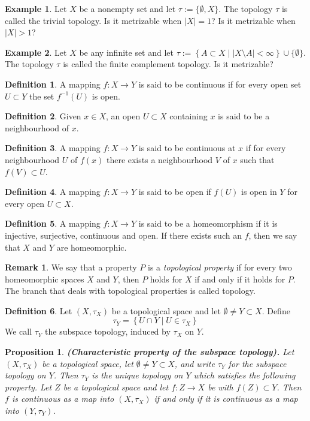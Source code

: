 \documentclass[11pt,a4paper]{article}
\theoremstyle{definition}
\newtheorem{definition}{Definition}[section]
\newtheorem{remark}{Remark}[section]
\newtheorem{example}{Example}[section]
\theoremstyle{plain}
\newtheorem{proposition}[theorem]{Proposition}
\newcommand{\set}[2]{ \left\{ #1 \mid #2 \right\} }
\newcommand{\abs}[1]{\left\lvert #1\right\rvert}
\renewcommand{\tt}[1]{\textnormal{\textbf{(#1).}}} %
\begin{document}
	\begin{example}
		Let $X$ be a nonempty set and let $\tau := \{\emptyset,X\}$. The topology 
		$\tau$ is called the trivial topology. Is it metrizable when $|X| = 1$?
		Is it metrizable when $|X| > 1$?
	\end{example}
	\begin{example}
		Let $X$ be any infinite set and let 
		$\tau := \set{A \subset X}{\abs{X \setminus A} < \infty} \cup
		\{\emptyset\}.$ 
		The topology $\tau$ is called the finite complement topology. Is it 
		metrizable?
	\end{example}
	\begin{definition}
		A mapping $f \colon X \to Y$ is said to be continuous if for every open
		set $U \subset Y$ the set $f^{-1}(U)$ is open.
	\end{definition}
	\begin{definition}
		Given $x \in X$, an open $U \subset X$ containing $x$ is said to be a
		neighbourhood of $x$.
	\end{definition}
	\begin{definition}
		A mapping $f \colon X \to Y$ is said to be continuous at $x$ if for 
		every neighbourhood $U$ of $f(x)$ there exists a neighbourhood $V$
		of $x$ such that $f(V) \subset U$.
	\end{definition}
	\begin{definition}
		A mapping $f \colon X \to Y$ is said to be open if $f(U)$ is open in $Y$
		for every open $U \subset X$.
	\end{definition}
	\begin{definition}
		A mapping $f \colon X \to Y$ is said to be a homeomorphism if it is
		injective, surjective, continuous and open. If there exists such an $f$, 
		then we say that $X$ and $Y$ are homeomorphic.
	\end{definition}
	\begin{remark}
		We say that a property $P$ is a \emph{topological property} if for every
		two homeomorphic spaces $X$ and $Y$, then $P$ holds for $X$ if and only
		if it holds for $P$. The branch that deals with topological properties
		is called topology.
	\end{remark}
	\begin{definition}
		Let $(X,\tau_X)$ be a topological space and let $\emptyset \neq Y \subset 
		X$. Define
		\[
			\tau_Y = \set{U \cap Y}{U \in \tau_X}
		\]
		We call $\tau_Y$ the subspace topology, induced by $\tau_X$ on $Y$.
	\end{definition}
	\begin{proposition}
		\tt{Characteristic property of the subspace topology}
		Let $(X, \tau_X)$
		be a topological space, let $\emptyset \neq Y \subset X$, and write 
		$\tau_Y$ for the subspace topology on $Y$. Then $\tau_Y$ is the unique 
		topology on $Y$ which satisfies the following property. Let $Z$
		be a topological space and let $f \colon Z \to X$ be with 
		$f(Z) \subset Y$. Then $f$ is continuous as a map into $(X, \tau_X)$ if 
		and only if it is continuous as a map into $(Y, \tau_Y)$.
	\end{proposition}
\end{document}
